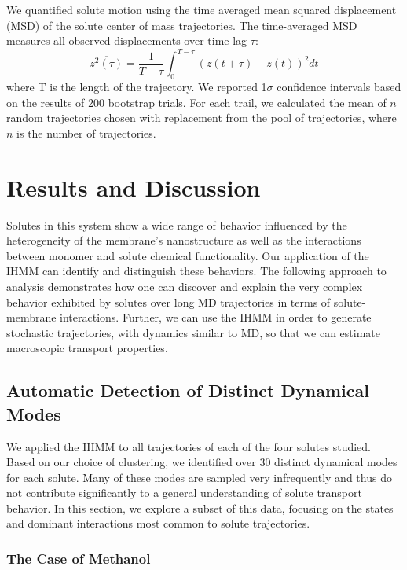 \documentclass{article}
\begin{document}
  We quantified solute motion using the time averaged mean squared displacement (MSD)
  of the solute center of mass trajectories. The time-averaged MSD measures all observed
  displacements over time lag $\tau$:
  \begin{equation}
  	\overline{z^2(\tau)} = \dfrac{1}{T - \tau}\int_{0}^{T - \tau} (z(t + \tau) - z(t))^2 dt
  \label{eqn:tamsd}
  \end{equation}
  where T is the length of the trajectory. We reported 1$\sigma$ confidence intervals 
  based on the results of 200 bootstrap trials. For each trail, we calculated the mean of 
  $n$ random trajectories chosen with replacement from the pool of trajectories, where 
  $n$ is the number of trajectories.

  \section{Results and Discussion}
  
  Solutes in this system show a wide range of behavior influenced by the 
  heterogeneity of the membrane's nanostructure as well as the interactions 
  between monomer and solute chemical functionality. Our application of the 
  IHMM can identify and distinguish these behaviors. The following approach 
  to analysis demonstrates how one can discover and explain the very complex
  behavior exhibited by solutes over long MD trajectories in terms of 
  solute-membrane interactions. Further, we can use the IHMM in order to generate
  stochastic trajectories, with dynamics similar to MD, so that we can estimate 
  macroscopic transport properties. 	

  \subsection{Automatic Detection of Distinct Dynamical Modes}\label{section:find_modes}
  
  We applied the IHMM to all trajectories of each of the four solutes studied.
  Based on our choice of clustering, we identified over 30 distinct dynamical
  modes for each solute. Many of these modes are sampled very infrequently and thus
  do not contribute significantly to a general understanding of solute transport behavior.
  In this section, we explore a subset of this data, focusing on the states
  and dominant interactions most common to solute trajectories.

  \subsubsection*{The Case of Methanol}
  
\end{document}
